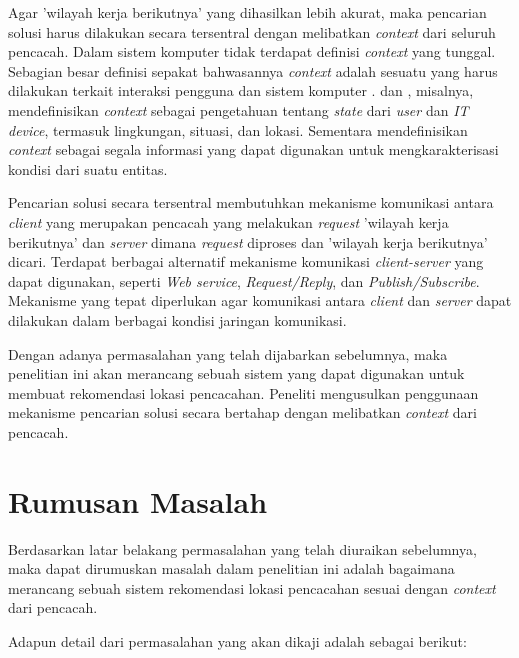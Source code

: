 Agar 'wilayah kerja berikutnya' yang dihasilkan lebih akurat, maka pencarian solusi harus dilakukan secara tersentral dengan melibatkan \textit{context} dari seluruh pencacah. Dalam sistem komputer tidak terdapat definisi \textit{context} yang tunggal. Sebagian besar definisi sepakat bahwasannya \textit{context} adalah sesuatu yang harus dilakukan terkait interaksi pengguna dan sistem komputer \citep{chen_survey_2000}. \citep{schilit_context-aware_1994} dan  \citep{schmidt_there_1999}, misalnya, mendefinisikan \textit{context} sebagai pengetahuan tentang \textit{state} dari \textit{user} dan \textit{IT device}, termasuk lingkungan, situasi, dan lokasi. Sementara \citep{abowd_towards_1999} mendefinisikan \textit{context} sebagai segala informasi yang dapat digunakan untuk mengkarakterisasi kondisi dari suatu entitas.


Pencarian solusi secara tersentral membutuhkan mekanisme komunikasi antara \textit{client} yang merupakan pencacah yang melakukan \textit{request} 'wilayah kerja berikutnya' dan \textit{server} dimana \textit{request} diproses dan 'wilayah kerja berikutnya' dicari. Terdapat berbagai alternatif mekanisme komunikasi \textit{client-server} yang dapat digunakan, seperti \textit{Web service}, \textit{Request/Reply}, dan \textit{Publish/Subscribe}. Mekanisme yang tepat diperlukan agar komunikasi antara \textit{client} dan \textit{server} dapat dilakukan dalam berbagai kondisi jaringan komunikasi.


Dengan adanya permasalahan yang telah dijabarkan sebelumnya, maka penelitian ini akan merancang sebuah sistem yang dapat digunakan untuk membuat rekomendasi lokasi pencacahan. Peneliti mengusulkan penggunaan mekanisme pencarian solusi secara bertahap dengan melibatkan \textit{context} dari pencacah.


\section{Rumusan Masalah}
Berdasarkan latar belakang permasalahan yang telah diuraikan sebelumnya, maka dapat dirumuskan masalah dalam penelitian ini adalah bagaimana merancang sebuah sistem rekomendasi lokasi pencacahan sesuai dengan \textit{context} dari pencacah.


Adapun detail dari permasalahan yang akan dikaji adalah sebagai berikut:

